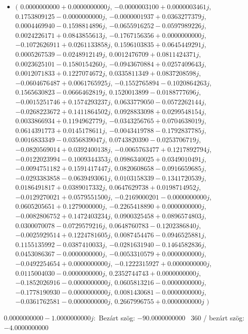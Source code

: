 \documentclass[14pt,a4paper]{article}
\begin{document}
\begin{itemize}
\item
$\big($
$0.0000000000+0.0000000000j$, $-0.0000003100+0.0000003461j$, $0.1753809125-0.0000000000j$, $-0.0000001937+0.0363277379j$, $0.0004469940-0.1598814896j$, $-0.0655916252-0.0597989226j$, $0.0024226171+0.0843855613j$, $-0.1767156356+0.0000000000j$, $-0.1072626911+0.0261133858j$, $0.1596103835+0.0645449291j$, $0.0005267539-0.0248912149j$, $0.0012476709+0.0811424371j$, $0.0023625101-0.1580154260j$, $-0.0943670884+0.0257409643j$, $0.0012071833+0.1227074672j$, $0.0335811349+0.0837208598j$, $-0.0604676487+0.0061765925j$, $-0.1552765894-0.1020864263j$, $0.1565630823-0.0666462819j$, $0.1520013899-0.0188777696j$, $-0.0015251746+0.1574293237j$, $0.0633779050-0.0572262144j$, $-0.0268223672+0.1411864502j$, $0.0928833098+0.0299548154j$, $0.0033866934+0.1194962779j$, $-0.0343256765+0.0704638019j$, $0.0614391773+0.0145178611j$, $-0.0043419788-0.1792837785j$, $0.0016833349-0.0356839047j$, $0.0743820390-0.0253706719j$, $-0.0820569014+0.0392400138j$, $-0.0065763477+0.1217892794j$, $-0.0122023994-0.1009344353j$, $0.0986340025+0.0349010491j$, $-0.0094751182+0.1591417447j$, $0.0820608658-0.0916659685j$, $-0.0293383858-0.0639493061j$, $0.0103158339-0.1341720539j$, $0.0186491817+0.0389017332j$, $0.0647629738+0.0198714952j$, $-0.0129270021+0.0579551500j$, $-0.2169000201-0.0000000000j$, $0.0605205651+0.1279000000j$, $-0.2265418890+0.0000000000j$, $-0.0082806752+0.1472403234j$, $0.0900325458+0.0896574803j$, $0.0300070078-0.0729579216j$, $0.0648760783-0.1202386840j$, $-0.0025929514+0.1224781605j$, $0.0087454476-0.0946525881j$, $0.1155135992-0.0387410033j$, $-0.0281631940-0.1464582836j$, $0.0453086367-0.0000000000j$, $-0.0053310579+0.0000000000j$, $-0.0492254654+0.0000000000j$, $-0.1222315927+0.0000000000j$, $0.0115004030-0.0000000000j$, $0.2352744743+0.0000000000j$, $-0.1852026916-0.0000000000j$, $0.0605813216-0.0000000000j$, $-0.1778190930-0.0000000000j$, $0.0081430681-0.0000000000j$, $-0.0361762581-0.0000000000j$, $0.2667996755+0.0000000000j$
$\big)$
\end{itemize}
$0.0000000000-1.0000000000j$:\
Bezárt szög: $-90.0000000000$ \
360 / bezárt szög: $-4.0000000000$\
\end{document}
